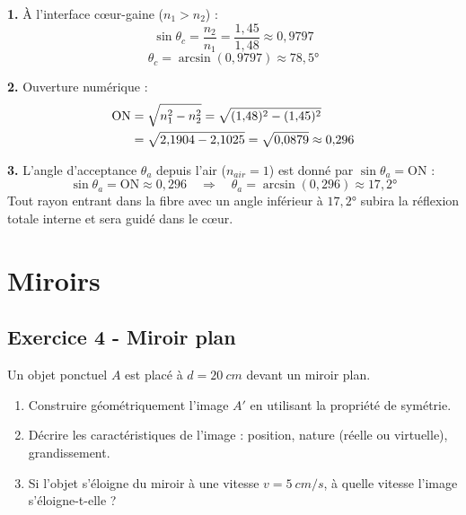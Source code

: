 \documentclass[12pt,a4paper]{article}
\begin{document}
\begin{boitecorrige}
\textbf{1.} À l'interface c\oe{}ur-gaine ($n_1 > n_2$) :
\[
\sin\theta_c = \frac{n_2}{n_1} = \frac{1{,}45}{1{,}48} \approx 0{,}9797
\]
\[
\theta_c = \arcsin(0{,}9797) \approx 78{,}5°
\]

\textbf{2.} Ouverture numérique :
\begin{align}
\text{ON} &= \sqrt{n_1^2 - n_2^2} = \sqrt{(1{,}48)^2 - (1{,}45)^2} \notag \\
&= \sqrt{2{,}1904 - 2{,}1025} = \sqrt{0{,}0879} \approx 0{,}296
\end{align}

\textbf{3.} L'angle d'acceptance $\theta_a$ depuis l'air ($n_{air}=1$) est donné par $\sin\theta_a = \text{ON}$ :
\[
\sin\theta_a = \text{ON} \approx 0{,}296 \quad \Rightarrow \quad \theta_a = \arcsin(0{,}296) \approx 17{,}2°
\]
Tout rayon entrant dans la fibre avec un angle inférieur à $17{,}2°$ subira la réflexion totale interne et sera guidé dans le c\oe{}ur.
\end{boitecorrige}

\newpage
\section{Miroirs}

\subsection*{Exercice 4 - Miroir plan \niveau{\facile}}

\begin{boiteexercice}
Un objet ponctuel $A$ est placé à $d = \qty{20}{cm}$ devant un miroir plan.
\begin{enumerate}
  \item Construire géométriquement l'image $A'$ en utilisant la propriété de symétrie.
  \item Décrire les caractéristiques de l'image : position, nature (réelle ou virtuelle), grandissement.
  \item Si l'objet s'éloigne du miroir à une vitesse $v = \qty{5}{cm/s}$, à quelle vitesse l'image s'éloigne-t-elle ?
\end{enumerate}
\end{boiteexercice}
\end{document}
